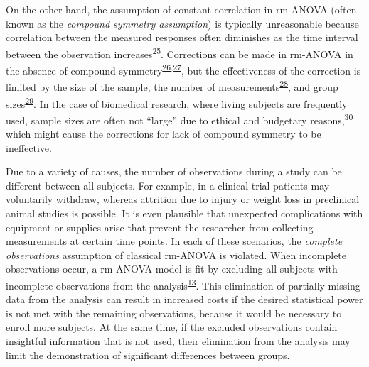 \documentclass[
]{article}
\begin{document}
On the other hand, the assumption of constant correlation in rm-ANOVA (often known as the \emph{compound symmetry assumption}) is typically unreasonable because correlation between the measured responses often diminishes as the time interval between the observation increases\textsuperscript{\protect\hyperlink{ref-ugrinowitsch2004}{25}}. Corrections can be made in rm-ANOVA in the absence of compound symmetry\textsuperscript{\protect\hyperlink{ref-huynh1976}{26},\protect\hyperlink{ref-greenhouse1959}{27}}, but the effectiveness of the correction is limited by the size of the sample, the number of measurements\textsuperscript{\protect\hyperlink{ref-haverkamp2017}{28}}, and group sizes\textsuperscript{\protect\hyperlink{ref-keselman2001}{29}}. In the case of biomedical research, where living subjects are frequently used, sample sizes are often not ``large'' due to ethical and budgetary reasons,\textsuperscript{\protect\hyperlink{ref-charan2013}{30}} which might cause the corrections for lack of compound symmetry to be ineffective.

Due to a variety of causes, the number of observations during a study can be different between all subjects. For example, in a clinical trial patients may voluntarily withdraw, whereas attrition due to injury or weight loss in preclinical animal studies is possible. It is even plausible that unexpected complications with equipment or supplies arise that prevent the researcher from collecting measurements at certain time points. In each of these scenarios, the \emph{complete observations} assumption of classical rm-ANOVA is violated. When incomplete observations occur, a rm-ANOVA model is fit by excluding all subjects with incomplete observations from the analysis\textsuperscript{\protect\hyperlink{ref-gueorguieva2004}{13}}. This elimination of partially missing data from the analysis can result in increased costs if the desired statistical power is not met with the remaining observations, because it would be necessary to enroll more subjects. At the same time, if the excluded observations contain insightful information that is not used, their elimination from the analysis may limit the demonstration of significant differences between groups.
\end{document}
